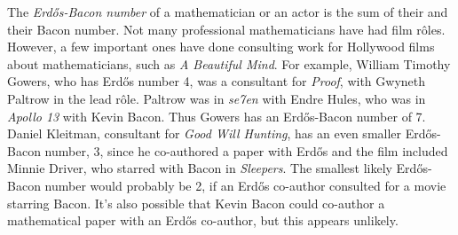 \documentclass[12pt]{article}
\begin{document}

The {\em Erd\H{o}s-Bacon number} of a mathematician or an actor is the sum of their  and their Bacon number. Not many professional mathematicians have had film r\^oles. However, a few important ones have done consulting work for Hollywood films about mathematicians, such as {\it A Beautiful Mind}. For example, William Timothy Gowers, who has Erd\H{o}s number 4, was a consultant for {\it Proof}, with Gwyneth Paltrow in the lead r\^ole. Paltrow was in {\it se7en} with Endre Hules, who was in {\it Apollo 13} with Kevin Bacon. Thus Gowers has an Erd\H{o}s-Bacon number of 7. Daniel Kleitman, consultant for {\it Good Will Hunting}, has an even smaller Erd\H{o}s-Bacon number, 3, since he co-authored a paper with Erd\H{o}s and the film included Minnie Driver, who starred with Bacon in {\it Sleepers}. The smallest likely Erd\H{o}s-Bacon number would probably be 2, if an Erd\H{o}s co-author consulted for a movie starring Bacon. It's also possible that Kevin Bacon could co-author a mathematical paper with an Erd\H{o}s co-author, but this appears unlikely.

\end{document}
